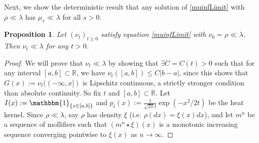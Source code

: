 \documentclass{article}
\newtheorem{propn}[theorem]{Proposition}
\newcommand{\B}[1]{\mathbb{#1}}
\newcommand{\is}{\mathbbm{1}}
\begin{document}
Next, we show the deterministic result that any solution of \eqref{muinfLimit} with $\rho\ll \lambda$ has $\mu_s\ll \lambda$ for all $s>0$.

\vspace{1em}

\begin{propn} \label{absContEverywhere}
    Let $(\nu_t)_{t\geq 0}$ satisfy equation \eqref{muinfLimit} with $\nu_0=\rho\ll \lambda$. Then $\nu_t \ll \lambda$ for any $t>0$. 
\end{propn}

\begin{proof}
    We will prove that $\nu_t \ll \lambda$ by showing that $\exists C=C(t)>0$ such that for any interval $[a,b]\subset \B{R}$, we have $\nu_t([a,b])\leq C|b-a|$, since this shows that $G(x):=\nu_t((-\infty,x])$ is Lipschitz continuous, a strictly stronger condition than absolute continuity. So fix $t$ and $[a,b]\subset \B{R}$. Let $I(x):=\is_{\{x\in [a,b]\}}$ and $p_t(x):=\frac{1}{\sqrt{2\pi} t}\exp(-x^2/2t)$ be the heat kernel. Since $\rho\ll\lambda$, say $\rho$ has density $\xi$ (i.e. $\rho(dx)=\xi(x)dx$), and let $m^n$ be a sequence of mollifiers such that $(m^n\star \xi)(x)$ is a monotonic increasing sequence converging pointwise to $\xi(x)$ as $n\to\infty$. 
    

\end{proof}
\end{document}
